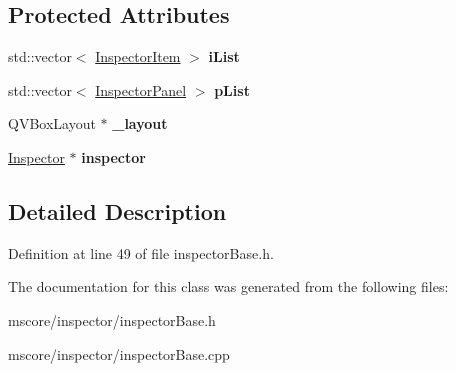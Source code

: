 \subsection*{Protected Attributes}
\begin{DoxyCompactItemize}
\item 
\mbox{\label{class_ms_1_1_inspector_base_af74db5a350fce689d55d2975ff12ad95}} 
std\+::vector$<$ \hyperlink{struct_ms_1_1_inspector_item}{Inspector\+Item} $>$ {\bfseries i\+List}
\item 
\mbox{\label{class_ms_1_1_inspector_base_a23adf94a498dcbd34153c94186b8af8b}} 
std\+::vector$<$ \hyperlink{struct_ms_1_1_inspector_panel}{Inspector\+Panel} $>$ {\bfseries p\+List}
\item 
\mbox{\label{class_ms_1_1_inspector_base_a1d7de6dfb7de75c2e625db5a23259f65}} 
Q\+V\+Box\+Layout $\ast$ {\bfseries \+\_\+layout}
\item 
\mbox{\label{class_ms_1_1_inspector_base_ac793b8e7c02cab776213d0aa48df9fad}} 
\hyperlink{class_ms_1_1_inspector}{Inspector} $\ast$ {\bfseries inspector}
\end{DoxyCompactItemize}


\subsection{Detailed Description}


Definition at line 49 of file inspector\+Base.\+h.



The documentation for this class was generated from the following files\+:\begin{DoxyCompactItemize}
\item 
mscore/inspector/inspector\+Base.\+h\item 
mscore/inspector/inspector\+Base.\+cpp\end{DoxyCompactItemize}
